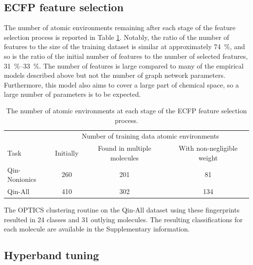 \subsection{ECFP feature selection}

The number of atomic environments remaining after each stage of the feature selection process is reported in Table \ref{tab:ecfp-fs}. Notably, the ratio of the number of features to the size of the training dataset is similar at
approximately \SI{74}{\%}, and so is the ratio of the initial number of features to the number of selected features, \SIrange{31}{33}{\%}. The number of features is large compared to many of the empirical models described above but not the number of graph network parameters. Furthermore, this model also aims to cover a large part of chemical space, so a large number of parameters is to be expected.

\begin{table}
    \centering
    \caption{The number of atomic environments at each stage of the ECFP feature selection process.}
    \label{tab:ecfp-fs}
    \begin{tabular}{@{}lccc@{}} \toprule
                      & \multicolumn{3}{c}{Number of training data atomic environments}                                                            \\\cmidrule(l){2-4}
        Task          & Initially                                                       & Found in multiple molecules & With non-negligible weight \\\midrule
        Qin-Nonionics & 260                                                             & 201                         & 81                         \\
        Qin-All       & 410                                                             & 302                         & 134                        \\\bottomrule
    \end{tabular}
\end{table}

The OPTICS clustering routine on the Qin-All dataset using these fingerprints
resulted in 24 classes and 31 outlying molecules. The resulting classifications
for each molecule are available in the Supplementary information.

\subsection{Hyperband tuning}

